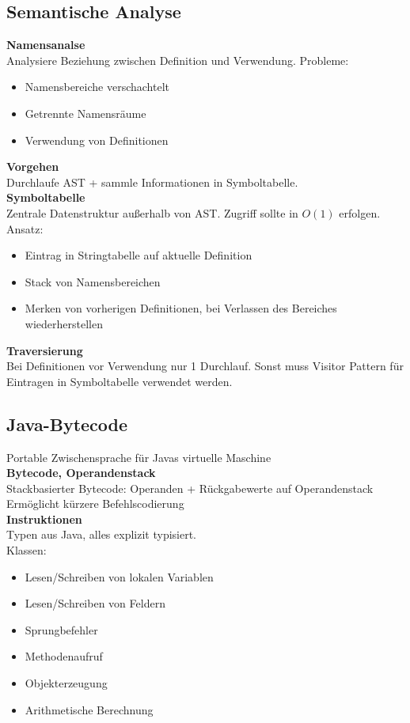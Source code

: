 \subsection{Semantische Analyse}%
\label{cmp:sub:semantische-analyse}
\textbf{Namensanalse}\\
Analysiere Beziehung zwischen Definition und Verwendung.
Probleme:
\begin{itemize}
\item Namensbereiche verschachtelt
\item Getrennte Namensräume
\item Verwendung von Definitionen
\end{itemize}

\textbf{Vorgehen}\\
Durchlaufe AST + sammle Informationen in Symboltabelle.\\

\textbf{Symboltabelle}\\
Zentrale Datenstruktur außerhalb von AST. Zugriff sollte in \(O(1)\) erfolgen.\\
Ansatz:
\begin{itemize}
\item Eintrag in Stringtabelle auf aktuelle Definition
\item Stack von Namensbereichen
\item Merken von vorherigen Definitionen, bei Verlassen des Bereiches wiederherstellen
\end{itemize}

\textbf{Traversierung}\\
Bei Definitionen vor Verwendung nur 1 Durchlauf. Sonst muss Visitor Pattern für Eintragen in Symboltabelle verwendet werden.

\subsection{Java-Bytecode}%
\label{cmp:sub:java-bytecode}
Portable Zwischensprache für Javas virtuelle Maschine\\

\textbf{Bytecode, Operandenstack}\\
Stackbasierter Bytecode: Operanden + Rückgabewerte auf Operandenstack\\
Ermöglicht kürzere Befehlscodierung\\

\textbf{Instruktionen}\\
Typen aus Java, alles explizit typisiert.\\
Klassen:
\begin{itemize}
\item Lesen/Schreiben von lokalen Variablen
\item Lesen/Schreiben von Feldern
\item Sprungbefehler
\item Methodenaufruf
\item Objekterzeugung
\item Arithmetische Berechnung
\end{itemize}

